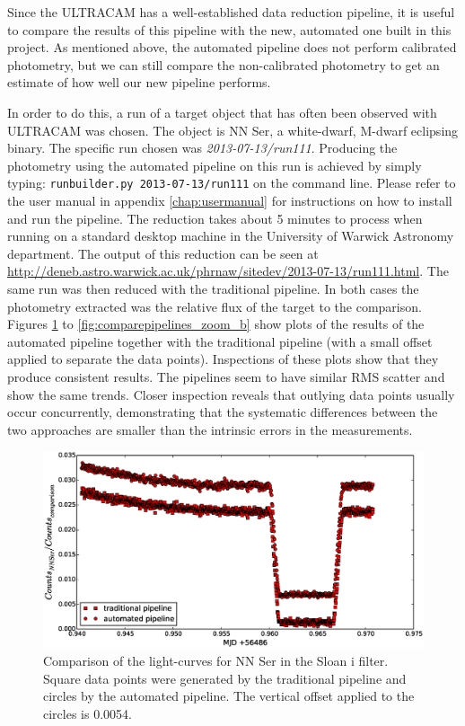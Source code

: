 Since the ULTRACAM has a well-established data reduction pipeline, it is useful to compare the results of this pipeline with the new, automated one built in this project. As mentioned above, the automated pipeline does not perform calibrated photometry, but we can still compare the non-calibrated photometry to get an estimate of how well our new pipeline performs.

In order to do this, a run of a target object that has often been observed with ULTRACAM was chosen. The object is NN Ser, a white-dwarf, M-dwarf eclipsing binary. The specific run chosen was \emph{2013-07-13/run111}. Producing the photometry using the automated pipeline on this run is achieved by simply typing: \texttt{runbuilder.py 2013-07-13/run111} on the command line. Please refer to the user manual in appendix \ref{chap:usermanual} for instructions on how to install and run the pipeline.  The reduction takes about 5 minutes to process when running on a standard desktop machine in the University of Warwick Astronomy department. The output of this reduction can be seen at \url{http://deneb.astro.warwick.ac.uk/phrnaw/sitedev/2013-07-13/run111.html}. The same run was then reduced with the traditional pipeline. In both cases the photometry extracted was the relative flux of the target to the comparison. Figures \ref{fig:comparepipelines_r} to \ref{fig:comparepipelines_zoom_b} show plots of the results of the automated pipeline together with the traditional pipeline (with a small offset applied to separate the data points). Inspections of these plots show that they produce consistent results. The pipelines seem to have similar RMS scatter and show the same trends. Closer inspection reveals that outlying data points usually occur concurrently,  demonstrating that the systematic differences between the two approaches are smaller than the intrinsic errors in the measurements. 

\begin{figure}
\centering
\includegraphics[width=140mm]{images/nn_ser_compare_r.eps}
\caption{Comparison of the light-curves for NN Ser in the Sloan i filter. Square data points were generated by the traditional pipeline and circles by the automated pipeline. The vertical offset applied to the circles is 0.0054. }
\label{fig:comparepipelines_r}
\end{figure}

